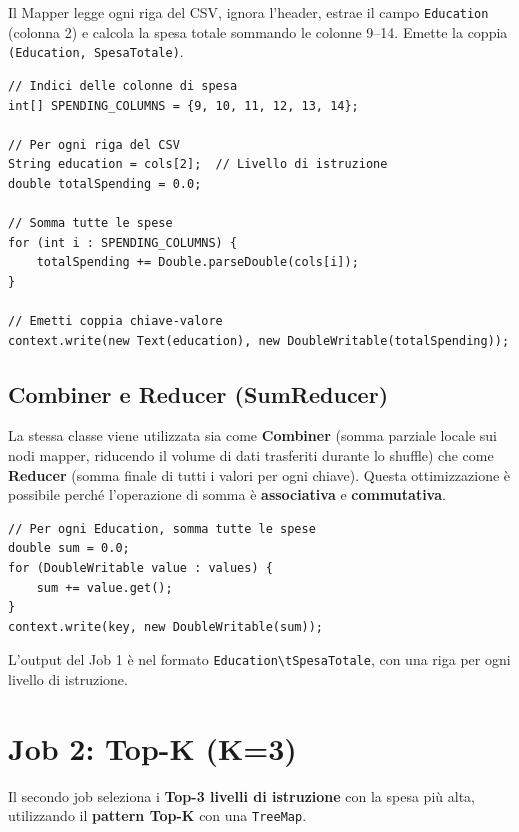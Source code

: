 \documentclass[a4paper, 12pt, oneside]{report}
\begin{document}
Il Mapper legge ogni riga del CSV, ignora l'header, estrae il campo \texttt{Education} (colonna 2) e calcola la spesa totale sommando le colonne 9--14. Emette la coppia \texttt{(Education, SpesaTotale)}.

\begin{lstlisting}[caption=Logica del SumMapper]
// Indici delle colonne di spesa
int[] SPENDING_COLUMNS = {9, 10, 11, 12, 13, 14};

// Per ogni riga del CSV
String education = cols[2];  // Livello di istruzione
double totalSpending = 0.0;

// Somma tutte le spese
for (int i : SPENDING_COLUMNS) {
    totalSpending += Double.parseDouble(cols[i]);
}

// Emetti coppia chiave-valore
context.write(new Text(education), new DoubleWritable(totalSpending));
\end{lstlisting}

\subsection{Combiner e Reducer (SumReducer)}

La stessa classe viene utilizzata sia come \textbf{Combiner} (somma parziale locale sui nodi mapper, riducendo il volume di dati trasferiti durante lo shuffle) che come \textbf{Reducer} (somma finale di tutti i valori per ogni chiave). Questa ottimizzazione \`e possibile perch\'e l'operazione di somma \`e \textbf{associativa} e \textbf{commutativa}.

\begin{lstlisting}[caption=Logica del SumReducer]
// Per ogni Education, somma tutte le spese
double sum = 0.0;
for (DoubleWritable value : values) {
    sum += value.get();
}
context.write(key, new DoubleWritable(sum));
\end{lstlisting}

L'output del Job 1 \`e nel formato \texttt{Education\textbackslash tSpesaTotale}, con una riga per ogni livello di istruzione.

\section{Job 2: Top-K (K=3)}

Il secondo job seleziona i \textbf{Top-3 livelli di istruzione} con la spesa pi\`u alta, utilizzando il \textbf{pattern Top-K} con una \texttt{TreeMap}.
\end{document}
